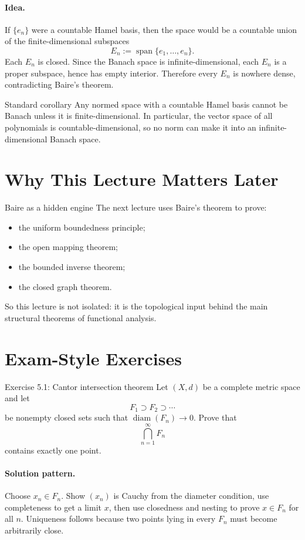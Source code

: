 \documentclass[header={Lecture 5 Exam Study Notes}]{study-note}
\begin{document}
\paragraph{Idea.}
If $\{e_n\}$ were a countable Hamel basis, then the space would be a countable union of the finite-dimensional subspaces
\[
E_n:=\operatorname{span}\{e_1,\dots,e_n\}.
\]
Each $E_n$ is closed. Since the Banach space is infinite-dimensional, each $E_n$ is a proper subspace, hence has empty interior. Therefore every $E_n$ is nowhere dense, contradicting Baire's theorem.

\begin{warningbox}{Standard corollary}
Any normed space with a countable Hamel basis cannot be Banach unless it is finite-dimensional. In particular, the vector space of all polynomials is countable-dimensional, so no norm can make it into an infinite-dimensional Banach space.
\end{warningbox}

\section{Why This Lecture Matters Later}

\begin{exbox}{Baire as a hidden engine}
The next lecture uses Baire's theorem to prove:
\begin{itemize}
\item the uniform boundedness principle;
\item the open mapping theorem;
\item the bounded inverse theorem;
\item the closed graph theorem.
\end{itemize}
So this lecture is not isolated: it is the topological input behind the main structural theorems of functional analysis.
\end{exbox}

\section{Exam-Style Exercises}

\begin{exbox}{Exercise 5.1: Cantor intersection theorem}
Let $(X,d)$ be a complete metric space and let
\[
F_1\supset F_2\supset \cdots
\]
be nonempty closed sets such that $\operatorname{diam}(F_n)\to 0$. Prove that
\[
\bigcap_{n=1}^{\infty}F_n
\]
contains exactly one point.

\paragraph{Solution pattern.}
Choose $x_n\in F_n$. Show $(x_n)$ is Cauchy from the diameter condition, use completeness to get a limit $x$, then use closedness and nesting to prove $x\in F_n$ for all $n$. Uniqueness follows because two points lying in every $F_n$ must become arbitrarily close.
\end{exbox}
\end{document}
